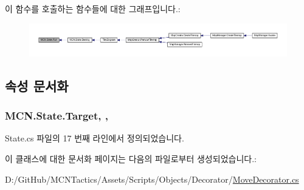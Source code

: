 이 함수를 호출하는 함수들에 대한 그래프입니다.\+:\nopagebreak
\begin{figure}[H]
\begin{center}
\leavevmode
\includegraphics[width=350pt]{class_m_c_n_1_1_state_afdec72a816a8a8ec584cac758a027215_icgraph}
\end{center}
\end{figure}




\subsection{속성 문서화}
\subsubsection[{\texorpdfstring{Target}{Target}}]{ M\+C\+N.\+State.\+Target\hspace{0.3cm}{\ttfamily [get]}, {\ttfamily [protected]}, {\ttfamily [inherited]}}\hypertarget{class_m_c_n_1_1_state_a79a563b32f183c9adc9a96679fc57eb8}{}\label{class_m_c_n_1_1_state_a79a563b32f183c9adc9a96679fc57eb8}


State.\+cs 파일의 17 번째 라인에서 정의되었습니다.



이 클래스에 대한 문서화 페이지는 다음의 파일로부터 생성되었습니다.\+:\begin{DoxyCompactItemize}
\item 
D\+:/\+Git\+Hub/\+M\+C\+N\+Tactics/\+Assets/\+Scripts/\+Objects/\+Decorator/\hyperlink{_move_decorator_8cs}{Move\+Decorator.\+cs}\end{DoxyCompactItemize}
